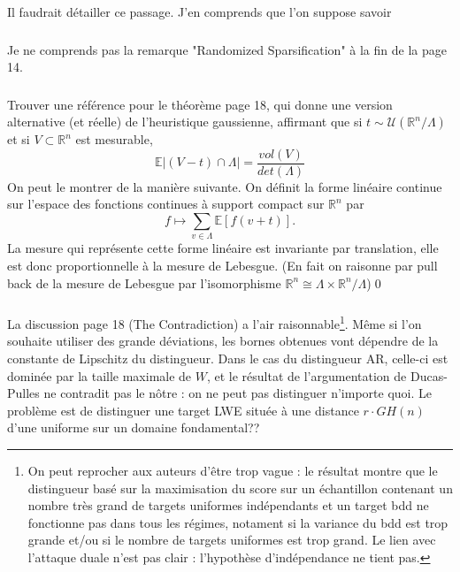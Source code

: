 \documentclass{article}
\begin{document}
Il faudrait détailler ce passage. J'en comprends que l'on suppose savoir 

\subsubsection{}
Je ne comprends pas la remarque "Randomized Sparsification" à la fin de la page 14.	

\subsubsection{}
Trouver une référence pour le théorème page 18, qui donne une version alternative (et réelle) de l'heuristique gaussienne, affirmant que si $t\sim \mathcal U(\mathbb R^n/\Lambda)$ et si $V\subset \mathbb R^n$ est mesurable, 
$$\mathbb E|(V -t)\cap \Lambda | = \frac{vol(V)}{det(\Lambda)}$$
On peut le montrer de la manière suivante. On définit la forme linéaire continue sur l'espace des fonctions continues à support compact sur $\mathbb R^n$ par 
$$f\mapsto \sum_{v\in \Lambda} \mathbb E[f(v+t )]. $$
La mesure qui représente cette forme linéaire est invariante par translation, elle est donc proportionnelle à la mesure de Lebesgue. (En fait on raisonne par pull back de la mesure de Lebesgue par l'isomorphisme $\mathbb R^n \cong \Lambda \times \mathbb R^n /\Lambda$)\qed 

\subsubsection{}

La discussion page 18 (The Contradiction) a l'air raisonnable\footnote{On peut reprocher aux auteurs d'être trop vague : le résultat montre que le distingueur basé sur la maximisation du score sur un échantillon contenant un nombre très grand de targets uniformes indépendants et un target bdd ne fonctionne pas dans tous les régimes, notament si la variance du bdd est trop grande et/ou si le nombre de targets uniformes est trop grand. Le lien avec l'attaque duale n'est pas clair : l'hypothèse d'indépendance ne tient pas.}. Même si l'on souhaite utiliser des grande déviations, les bornes obtenues vont dépendre de la constante de Lipschitz du distingueur. Dans le cas du distingueur AR, celle-ci est dominée par la taille maximale de $W$, et le résultat de l'argumentation de Ducas-Pulles ne contradit pas le nôtre : on ne peut pas distinguer n'importe quoi. Le problème est de distinguer une target LWE située à une distance $r\cdot GH(n)$ d'une uniforme sur un domaine fondamental?? 
\end{document}
